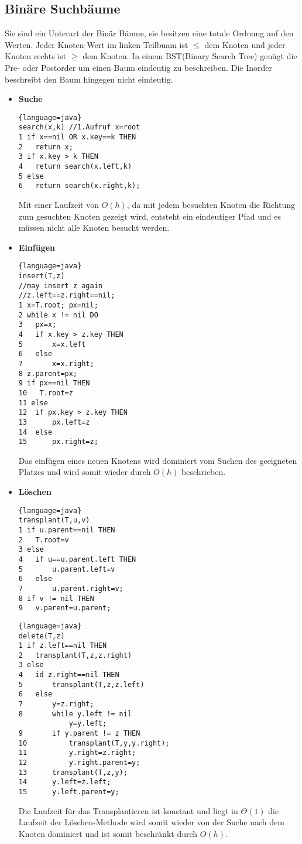 \documentclass[jou,apacite]{apa6}
\begin{document}
    \subsection{Binäre Suchbäume}
    Sie sind ein Unterart der Binär Bäume, sie besitzen eine totale Ordnung auf den Werten. Jeder Knoten-Wert im linken Teilbuam ist $\leq$ dem Knoten und jeder Knoten rechts ist $\geq$ dem Knoten. In einem BST(Binary Search Tree) genügt die Pre- oder Postorder um einen Baum eindeutig zu beschreiben. Die Inorder beschreibt den Baum hingegen nicht eindeutig.
    \begin{itemize}
        \item {\bfseries Suche}
        \begin{lstlisting}{language=java}
search(x,k) //1.Aufruf x=root
1 if x==nil OR x.key==k THEN
2   return x;
3 if x.key > k THEN
4   return search(x.left,k)
5 else
6   return search(x.right,k);
        \end{lstlisting}
        Mit einer Laufzeit von $O(h)$, da mit jedem besuchten Knoten die Richtung zum gesuchten Knoten gezeigt wird, entsteht ein eindeutiger Pfad und es müssen nicht alle Knoten besucht werden.
        
        \item {\bfseries Einfügen}
        \begin{lstlisting}{language=java}
insert(T,z)
//may insert z again
//z.left==z.right==nil;
1 x=T.root; px=nil;
2 while x != nil DO
3   px=x;
4   if x.key > z.key THEN
5       x=x.left
6   else
7       x=x.right;
8 z.parent=px;
9 if px==nil THEN
10   T.root=z
11 else
12  if px.key > z.key THEN
13      px.left=z
14  else
15      px.right=z;
        \end{lstlisting}
        Das einfügen eines neuen Knotens wird dominiert vom Suchen des geeigneten Platzes und wird somit wieder durch $O(h)$ beschrieben.
        \item {\bfseries Löschen}
        \begin{lstlisting}{language=java}
transplant(T,u,v)
1 if u.parent==nil THEN
2   T.root=v
3 else
4   if u==u.parent.left THEN
5       u.parent.left=v
6   else
7       u.parent.right=v;
8 if v != nil THEN
9   v.parent=u.parent;
        \end{lstlisting}
        \begin{lstlisting}{language=java}
delete(T,z)
1 if z.left==nil THEN
2   transplant(T,z,z.right)
3 else
4   id z.right==nil THEN
5       transplant(T,z,z.left)
6   else
7       y=z.right;
8       while y.left != nil
            y=y.left;
9       if y.parent != z THEN
10          transplant(T,y,y.right);
11          y.right=z.right;
12          y.right.parent=y;
13      transplant(T,z,y);
14      y.left=z.left;
15      y.left.parent=y;
        \end{lstlisting}
        Die Laufzeit für das Transplantieren ist konstant und liegt in $\Theta(1)$ die Laufzeit der Löschen-Methode wird somit wieder von der Suche nach dem Knoten dominiert und ist somit beschränkt durch $O(h)$.
    \end{itemize}
    
\end{document}
